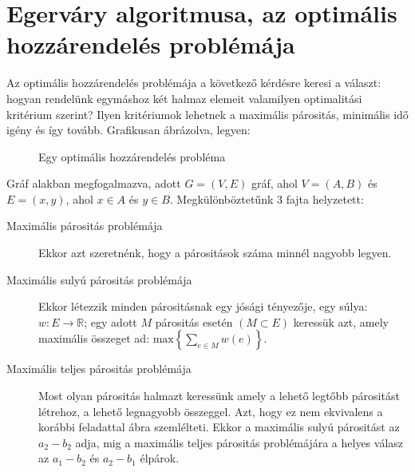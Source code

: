 \section{Egerváry algoritmusa, az optimális hozzárendelés problémája}

Az optimális hozzárendelés problémája a következő kérdésre keresi a választ:
hogyan rendelünk egymáshoz két halmaz elemeit valamilyen optimalitási kritérium
szerint? Ilyen kritériumok lehetnek a maximális párositás, minimális idő igény
és így tovább. Grafikusan ábrázolva, legyen:

\begin{figure}[ht]
\caption{Egy optimális hozzárendelés probléma}
\label{fig:OptHozProb}
\centering {} 
\end{figure}

Gráf alakban megfogalmazva, adott $G=(V, E)$ gráf, ahol $V=(A, B)$ és $E=(x,y)$,
ahol $x \in A$ és $ y \in B$. Megkülönböztetűnk $3$ fajta helyzetett:
\begin{description}
  \item[Maximális párositás problémája] Ekkor azt szeretnénk, hogy a párositások
  száma minnél nagyobb legyen.
  \item[Maximális sulyú párositás problémája] Ekkor létezzik minden párositásnak
  egy jósági tényezője, egy súlya: $w:E\rightarrow\mathbb{R}$; egy adott $M$
  párositás esetén $(M\subset E)$ keressük azt, amely maximális összeget ad:
  $\mbox{max}\left\{\sum_{e\in M}{w(e)}\right\}$.
  \item[Maximális teljes párositás problémája] Most olyan párositás halmazt
  keressünk amely a lehető legtőbb párositást létrehoz, a lehető legnagyobb
  összeggel. Azt, hogy ez nem ekvivalens a korábbi feladattal
   ábra szemlélteti. Ekkor a maximális sulyú párositást
  az $a_2-b_2$ adja, mig a maximális teljes párositás problémájára a helyes válasz
  az $a_1-b_2$ és $a_2-b_1$ élpárok. 
\end{description}

